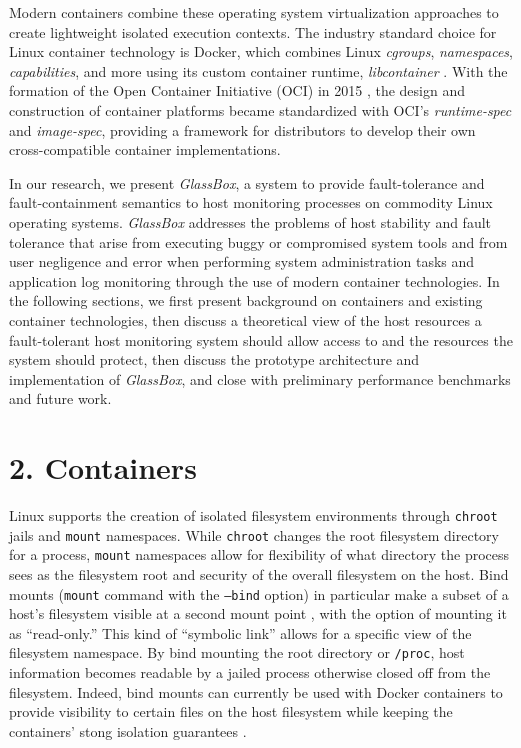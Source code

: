 \documentclass{proc}
\begin{document}
Modern containers combine these operating system virtualization approaches to create lightweight isolated execution contexts. The industry standard choice for Linux container technology is Docker, which combines Linux \textit{cgroups}, \textit{namespaces}, \textit{capabilities}, and more using its custom container runtime, \textit{libcontainer} \cite{hykes2014libcontainer}. With the formation of the Open Container Initiative (OCI) in 2015 \cite{opencontainerinitiative}, the design and construction of container platforms became standardized with OCI's \textit{runtime-spec} and \textit{image-spec}, providing a framework for distributors to develop their own cross-compatible container implementations.

In our research, we present \textit{GlassBox}, a system to provide fault-tolerance and fault-containment semantics to host monitoring processes on commodity Linux operating systems. \textit{GlassBox} addresses the problems of host stability and fault tolerance that arise from executing buggy or compromised system tools and from user negligence and error when performing system administration tasks and application log monitoring through the use of modern container technologies. In the following sections, we first present background on containers and existing container technologies, then discuss a theoretical view of the host resources a fault-tolerant host monitoring system should allow access to and the resources the system should protect, then discuss the prototype architecture and implementation of \textit{GlassBox}, and close with preliminary performance benchmarks and future work.

\section*{2. Containers}

Linux supports the creation of isolated filesystem environments through \texttt{chroot} jails and \texttt{mount} namespaces. While \texttt{chroot} changes the root filesystem directory for a process, \texttt{mount} namespaces allow for flexibility of what directory the process sees as the filesystem root and security of the overall filesystem on the host. Bind mounts (\texttt{mount} command with the \texttt{--bind} option) in particular make a subset of a host's filesystem visible at a second mount point \cite{bindmount}, with the option of mounting it as ``read-only.'' This kind of ``symbolic link'' allows for a specific view of the filesystem namespace. By bind mounting the root directory or \texttt{/proc}, host information becomes readable by a jailed process otherwise closed off from the filesystem. Indeed, bind mounts can currently be used with Docker containers to provide visibility to certain files on the host filesystem while keeping the containers' stong isolation guarantees \cite{dockerdoc}.
\end{document}
